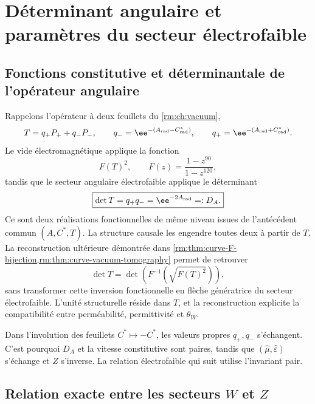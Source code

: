 \section{Déterminant angulaire et paramètres du secteur électrofaible}
\label{rm:ch:ew}

\subsection{Fonctions constitutive et déterminantale de l'opérateur angulaire}

Rappelons l'opérateur à deux feuillets du \cref{rm:ch:vacuum},
\begin{equation}
\label{rm:eq:ew-angular-operator}
T=q_+P_+ +q_-P_-,
\qquad
q_-=\ee^{-(A_{\rm rad}-C^*_{\rm rad})},
\qquad
q_+=\ee^{-(A_{\rm rad}+C^*_{\rm rad})}.
\end{equation}
Le vide électromagnétique applique la fonction
\begin{equation}
\label{rm:eq:ew-vacuum-reader}
F(T)^2,
\qquad
F(z)=\frac{1-z^{90}}{1-z^{120}},
\end{equation}
tandis que le secteur angulaire électrofaible applique le déterminant
\begin{equation}
\label{rm:eq:ew-determinant-reader}
\boxed{
\det T=q_+q_-=\ee^{-2A_{\rm rad}}=:D_A.}
\end{equation}
Ce sont deux réalisations fonctionnelles de même niveau issues de l’antécédent commun \((A,C^*,T)\). La structure causale les engendre toutes deux à partir de \(T\). La reconstruction ultérieure démontrée dans \cref{rm:thm:curve-F-bijection,rm:thm:curve-vacuum-tomography} permet de retrouver
\[
 \det T
 =\det\!\left(F^{-1}\!\left(\sqrt{F(T)^2}\right)\right),
\]
sans transformer cette inversion fonctionnelle en flèche génératrice du secteur électrofaible. L’unité structurelle réside dans \(T\), et la reconstruction explicite la compatibilité entre perméabilité, permittivité et \(\theta_W\).

Dans l'involution des feuillets \(C^*\mapsto-C^*\), les valeurs propres
\(q_+,q_-\) s'échangent. C'est pourquoi \(D_A\) et la vitesse constitutive
sont paires, tandis que \((\widehat\mu,\widehat\varepsilon)\) s'échange et
\(\widehat Z\) s'inverse. La relation électrofaible qui suit utilise
l'invariant pair.

\subsection{Relation exacte entre les secteurs \texorpdfstring{\(W\)}{W} et \texorpdfstring{\(Z\)}{Z}}

